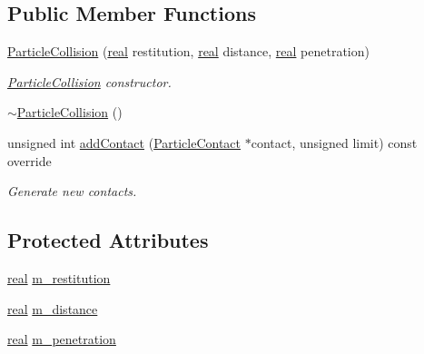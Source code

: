\subsection*{Public Member Functions}
\begin{DoxyCompactItemize}
\item 
\mbox{\hyperlink{classr3_1_1_particle_collision_af3c52ed10e7495207bf20f3263175098}{Particle\+Collision}} (\mbox{\hyperlink{namespacer3_ab2016b3e3f743fb735afce242f0dc1eb}{real}} restitution, \mbox{\hyperlink{namespacer3_ab2016b3e3f743fb735afce242f0dc1eb}{real}} distance, \mbox{\hyperlink{namespacer3_ab2016b3e3f743fb735afce242f0dc1eb}{real}} penetration)
\begin{DoxyCompactList}\small\item\em \mbox{\hyperlink{classr3_1_1_particle_collision}{Particle\+Collision}} constructor. \end{DoxyCompactList}\item 
\mbox{\hyperlink{classr3_1_1_particle_collision_a7227b004e41a96aafd5f9a54e3b6b97e}{$\sim$\+Particle\+Collision}} ()
\item 
unsigned int \mbox{\hyperlink{classr3_1_1_particle_collision_ab22f6b1c2d95c925c2dd5241be9b8889}{add\+Contact}} (\mbox{\hyperlink{classr3_1_1_particle_contact}{Particle\+Contact}} $\ast$contact, unsigned limit) const override
\begin{DoxyCompactList}\small\item\em Generate new contacts. \end{DoxyCompactList}\end{DoxyCompactItemize}
\subsection*{Protected Attributes}
\begin{DoxyCompactItemize}
\item 
\mbox{\hyperlink{namespacer3_ab2016b3e3f743fb735afce242f0dc1eb}{real}} \mbox{\hyperlink{classr3_1_1_particle_collision_a02dd7e5f227a429bcb707ad46adeb292}{m\+\_\+restitution}}
\item 
\mbox{\hyperlink{namespacer3_ab2016b3e3f743fb735afce242f0dc1eb}{real}} \mbox{\hyperlink{classr3_1_1_particle_collision_a269b3beb261aee2fbd784210025cdebf}{m\+\_\+distance}}
\item 
\mbox{\hyperlink{namespacer3_ab2016b3e3f743fb735afce242f0dc1eb}{real}} \mbox{\hyperlink{classr3_1_1_particle_collision_a4e27e43b9a17e4a1d04ff91b808b4da9}{m\+\_\+penetration}}
\end{DoxyCompactItemize}
